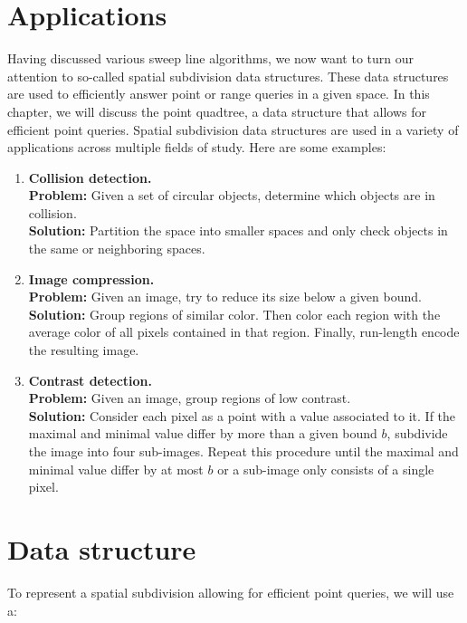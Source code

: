 \section{Applications}
    Having discussed various sweep line algorithms, we now want to turn our attention to so-called spatial subdivision data structures. These data structures are used to efficiently answer point or range queries in a given space. In this chapter, we will discuss the point quadtree, a data structure that allows for efficient point queries. Spatial subdivision data structures are used in a variety of applications across multiple fields of study. Here are some examples:
    \begin{enumerate}
        \item \textbf{Collision detection.} \\
        \textbf{Problem:} Given a set of circular objects, determine which objects are in collision. \\
        \textbf{Solution:} Partition the space into smaller spaces and only check objects in the same or neighboring spaces.
        
        \item \textbf{Image compression.} \\
        \textbf{Problem:} Given an image, try to reduce its size below a given bound. \\
        \textbf{Solution:} Group regions of similar color. Then color each region with the average color of all pixels contained in that region. Finally, run-length encode the resulting image.

        \item \textbf{Contrast detection.} \\
        \textbf{Problem:} Given an image, group regions of low contrast. \\
        \textbf{Solution:} Consider each pixel as a point with a value associated to it. If the maximal and minimal value differ by more than a given bound $b$, subdivide the image into four sub-images. Repeat this procedure until the maximal and minimal value differ by at most $b$ or a sub-image only consists of a single pixel.
    \end{enumerate}

\section{Data structure}
    To represent a spatial subdivision allowing for efficient point queries, we will use a:


